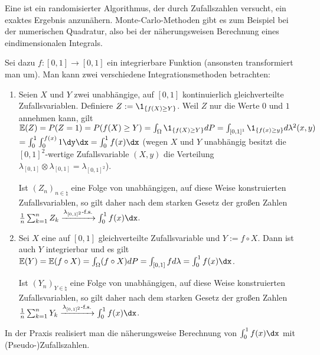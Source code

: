 \begin{Bem}
    Eine  ist ein randomisierter Algorithmus,
    der durch Zufallszahlen versucht, ein exaktes Ergebnis anzunähern.
    Monte-Carlo-Methoden gibt es zum Beispiel bei der numerischen Quadratur,
    also bei der näherungsweisen Berechnung eines eindimensionalen Integrals.

    Sei dazu $f\colon [0, 1] \rightarrow [0, 1]$ ein integrierbare Funktion
    (ansonsten transformiert man um).
    Man kann zwei verschiedene Integrationsmethoden betrachten:
    \begin{enumerate}
        \item
        Seien $X$ und $Y$ zwei unabhängige, auf $[0, 1]$ kontinuierlich gleichverteilte
        Zufallsvariablen.
        Definiere $Z := \1_{\{f(X) \ge Y\}}$.
        Weil $Z$ nur die Werte $0$ und $1$ annehmen kann, gilt\\
        $\EW(Z) = P(Z = 1) = P(f(X) \ge Y) = \int_\Omega \1_{\{f(X) \ge Y\}} dP
        = \int_{[0, 1]^1} \1_{\{f(x) \ge y\}} d\lambda^2(x, y)$\\
        $= \int_0^1 \int_0^{f(x)} 1 \dy\dx = \int_0^1 f(x)\dx$
        (wegen $X$ und $Y$ unabhängig besitzt die $[0, 1]^2$-wertige Zufallsvariable
        $(X, y)$ die Verteilung $\lambda_{[0, 1]} \otimes \lambda_{[0, 1]} = \lambda_{[0, 1]^2}$).

        Ist $(Z_n)_{n \in \natural}$ eine Folge von unabhängigen, auf diese Weise konstruierten
        Zufallsvariablen, so gilt daher nach dem starken Gesetz der großen Zahlen
        $\frac{1}{n} \sum_{k=1}^n Z_k \xrightarrow{\lambda_{[0,1]^2}\text{-f.s.}} \int_0^1 f(x)\dx$.

        \item
        Sei $X$ eine auf $[0, 1]$ gleichverteilte Zufallsvariable und $Y := f \circ X$.
        Dann ist auch $Y$ integrierbar und es gilt
        $\EW(Y) = \EW(f \circ X) = \int_\Omega (f \circ X)dP =
        \int_{[0, 1]} fd\lambda = \int_0^1 f(x)\dx$.

        Ist $(Y_n)_{Y \in \natural}$ eine Folge von unabhängigen, auf diese Weise konstruierten
        Zufallsvariablen, so gilt daher nach dem starken Gesetz der großen Zahlen
        $\frac{1}{n} \sum_{k=1}^n Y_k \xrightarrow{\lambda_{[0,1]^2}\text{-f.s.}} \int_0^1 f(x)\dx$.
    \end{enumerate}
    In der Praxis realisiert man die näherungsweise Berechnung von $\int_0^1 f(x)\dx$ mit\\
    (Pseudo-)Zufallszahlen.
\end{Bem}

